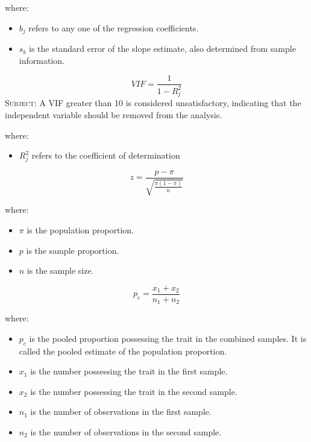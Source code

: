 where:
\begin{itemize}
 \item $b_{j}$ refers to any one of the regression coefficients.
 \item $s_{b}$ is the standard error of the slope estimate, also determined from sample information.
\end{itemize}
\hformbar


\begin{equation}
\label{multiple regression variance inflation factor}
VIF = \frac{1}{1 - R^2_{j}}
\end{equation}
\textsc{Subject:} A VIF greater than 10 is considered unsatisfactory, indicating that the independent variable should be removed from the analysis.

where:
\begin{itemize}
 \item $R^2_{j}$ refers to the coefficient of determination
\end{itemize}
\hformbar


\begin{equation}
\label{test hypothesis one proportion}
z = \frac{p - \pi}{\sqrt{\frac{\pi(1 - \pi)}{n}}}
\end{equation}

where:
\begin{itemize}
 \item $\pi$ is the population proportion.
 \item $p$ is the sample proportion.
 \item $n$ is the sample size.
\end{itemize}
\hformbar


\begin{equation}
\label{test hypothesis pooled proportion}
p_c = \frac{x_1 + x_2}{n_1 + n_2}
\end{equation}

where:
\begin{itemize}
 \item $p_{c}$ is the pooled proportion possessing the trait in the combined samples. It is called the pooled estimate of the population proportion.
 \item $x_1$ is the number possessing the trait in the first sample.
 \item $x_2$ is the number possessing the trait in the second sample.
 \item $n_{1}$ is the number of observations in the first sample.
 \item $n_{2}$ is the number of observations in the second sample.
 \end{itemize}
\hformbar



